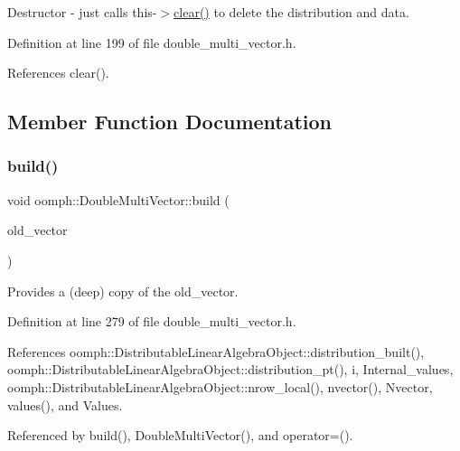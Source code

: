 Destructor -\/ just calls this-\/$>$\hyperlink{classoomph_1_1DoubleMultiVector_a6e4ab708964cd1dce2d47ea2c0fc91df}{clear()} to delete the distribution and data. 



Definition at line 199 of file double\+\_\+multi\+\_\+vector.\+h.



References clear().



\subsection{Member Function Documentation}
\mbox{\label{classoomph_1_1DoubleMultiVector_aff18cf0f4bf61f034b99a1542b60414b}} 
\subsubsection{\texorpdfstring{build()}{build()}\hspace{0.1cm}{\footnotesize\ttfamily [1/3]}}
{\footnotesize\ttfamily void oomph\+::\+Double\+Multi\+Vector\+::build (\begin{DoxyParamCaption}\item[{const \hyperlink{classoomph_1_1DoubleMultiVector}{Double\+Multi\+Vector} \&}]{old\+\_\+vector }\end{DoxyParamCaption})\hspace{0.3cm}{\ttfamily [inline]}}



Provides a (deep) copy of the old\+\_\+vector. 



Definition at line 279 of file double\+\_\+multi\+\_\+vector.\+h.



References oomph\+::\+Distributable\+Linear\+Algebra\+Object\+::distribution\+\_\+built(), oomph\+::\+Distributable\+Linear\+Algebra\+Object\+::distribution\+\_\+pt(), i, Internal\+\_\+values, oomph\+::\+Distributable\+Linear\+Algebra\+Object\+::nrow\+\_\+local(), nvector(), Nvector, values(), and Values.



Referenced by build(), Double\+Multi\+Vector(), and operator=().

